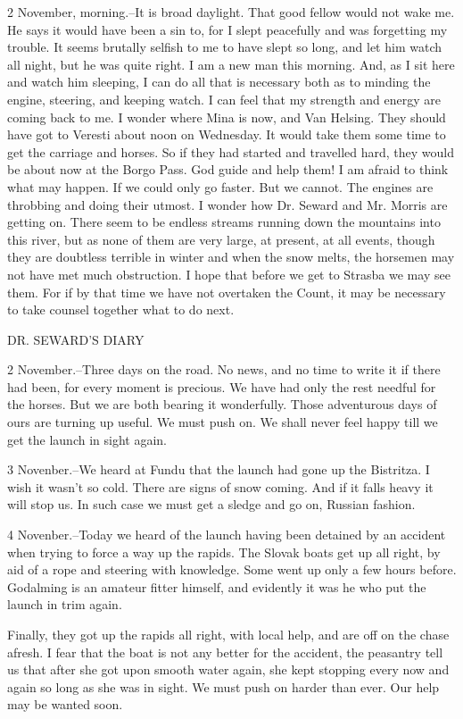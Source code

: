 2 November, morning.--It is broad daylight. That good fellow would not wake me. He says it would have been a sin to, for I slept peacefully and was forgetting my trouble. It seems brutally selfish to me to have slept so long, and let him watch all night, but he was quite right. I am a new man this morning. And, as I sit here and watch him sleeping, I can do all that is necessary both as to minding the engine, steering, and keeping watch. I can feel that my strength and energy are coming back to me. I wonder where Mina is now, and Van Helsing. They should have got to Veresti about noon on Wednesday. It would take them some time to get the carriage and horses. So if they had started and travelled hard, they would be about now at the Borgo Pass. God guide and help them! I am afraid to think what may happen. If we could only go faster. But we cannot. The engines are throbbing and doing their utmost. I wonder how Dr. Seward and Mr. Morris are getting on. There seem to be endless streams running down the mountains into this river, but as none of them are very large, at present, at all events, though they are doubtless terrible in winter and when the snow melts, the horsemen may not have met much obstruction. I hope that before we get to Strasba we may see them. For if by that time we have not overtaken the Count, it may be necessary to take counsel together what to do next. 

DR. SEWARD'S DIARY 

2 November.--Three days on the road. No news, and no time to write it if there had been, for every moment is precious. We have had only the rest needful for the horses. But we are both bearing it wonderfully. Those adventurous days of ours are turning up useful. We must push on. We shall never feel happy till we get the launch in sight again. 

3 Novenber.--We heard at Fundu that the launch had gone up the Bistritza. I wish it wasn't so cold. There are signs of snow coming. And if it falls heavy it will stop us. In such case we must get a sledge and go on, Russian fashion. 

4 Novenber.--Today we heard of the launch having been detained by an accident when trying to force a way up the rapids. The Slovak boats get up all right, by aid of a rope and steering with knowledge. Some went up only a few hours before. Godalming is an amateur fitter himself, and evidently it was he who put the launch in trim again. 

Finally, they got up the rapids all right, with local help, and are off on the chase afresh. I fear that the boat is not any better for the accident, the peasantry tell us that after she got upon smooth water again, she kept stopping every now and again so long as she was in sight. We must push on harder than ever. Our help may be wanted soon. 


